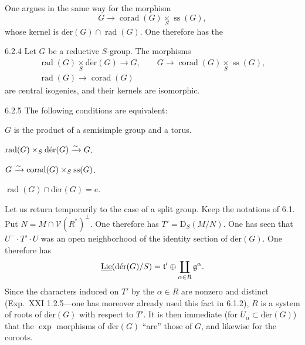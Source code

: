 One argues in the same way for the morphism
\[
G\to\operatorname{corad}(G)\underset S\times\operatorname{ss}(G),
\]
whose kernel is $\operatorname{d\acute er}(G)\cap\operatorname{rad}(G)$. One therefore has the
\begin{proposition}{6.2.4}\label{XXII.6.2.4}
Let $G$ be a reductive $S$-group. The morphisms
\[
\begin{gathered}
\operatorname{rad}(G)\underset S\times\operatorname{d\acute er}(G)\to G,\qquad
G\to\operatorname{corad}(G)\underset S\times\operatorname{ss}(G),\\
\operatorname{rad}(G)\to\operatorname{corad}(G)
\end{gathered}
\]
are central isogenies, and their kernels are isomorphic.
\end{proposition}
\begin{corollary}{6.2.5}\label{XXII.6.2.5}
The following conditions are equivalent:
\begin{enumeratei}
\item $G$ is the product of a semisimple group and a torus.
\item $\operatorname{rad}(G)\times_S\operatorname{d\acute er}(G)\xrightarrow{\sim} G$.
\item $G\xrightarrow{\sim}\operatorname{corad}(G)\times_S\operatorname{ss}(G)$.
\item $\operatorname{rad}(G)\cap\operatorname{d\acute er}(G)=e$.
\end{enumeratei}
\end{corollary}
\label{XXII.6.2.6}
Let us return temporarily to the case of a split group. Keep the notations of 6.1. Put $N=M\cap\mathcal V(R^*)^\perp$. One therefore has $T'=\mathrm D_S(M/N)$. One has seen that $U^-\cdot T'\cdot U$ was an open neighborhood of the identity section of $\operatorname{d\acute er}(G)$. One therefore has
\[
\underline{\operatorname{Lie}}(\operatorname{d\acute er}(G)/S)=\mathfrak t'\oplus\coprod_{\alpha\in R}\mathfrak g^\alpha.
\]
Since the characters induced on $T'$ by the $\alpha\in R$ are nonzero and distinct (\cf Exp.~XXI 1.2.5---one has moreover already used this fact in 6.1.2), $R$ is a system of roots of $\operatorname{d\acute er}(G)$ with respect to $T'$. It is then immediate (for $U_\alpha\subset\operatorname{d\acute er}(G)$) that the $\exp$ morphisms of $\operatorname{d\acute er}(G)$ ``are'' those of $G$, and likewise for the coroots.

